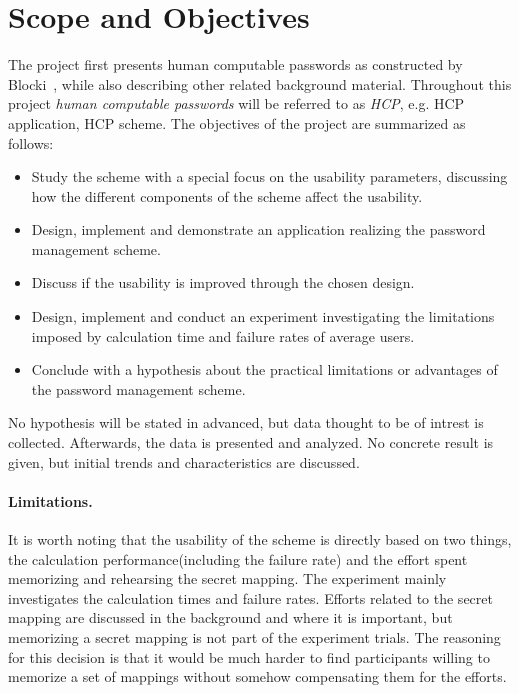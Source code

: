 
\section{Scope and Objectives}
The project first presents human computable passwords as constructed by Blocki~\cite{hcp-blocki}, while also describing other related background material. Throughout this project \emph{human computable passwords} will be referred to as \emph{HCP}, e.g. HCP application, HCP scheme. The objectives of the project are summarized as follows:
\begin{itemize}
    \item Study the scheme with a special focus on the usability parameters, discussing how the different components of the scheme affect the usability.
    \item Design, implement and demonstrate an application realizing the password management scheme.
    \item Discuss if the usability is improved through the chosen design. 
    \item Design, implement and conduct an experiment investigating the limitations imposed by calculation time and failure rates of average users.
    \item Conclude with a hypothesis about the practical limitations or advantages of the password management scheme.
\end{itemize}

\par No hypothesis will be stated in advanced, but data thought to be of intrest is collected. Afterwards, the data is presented and analyzed. No concrete result is given, but initial trends and characteristics are discussed.
\paragraph{Limitations.}
It is worth noting that the usability of the scheme is directly based on two things, the calculation performance(including the failure rate) and the effort spent memorizing and rehearsing the secret mapping. The experiment mainly investigates the calculation times and failure rates. Efforts related to the secret mapping are discussed in the background and where it is important, but memorizing a secret mapping is not part of the experiment trials. The reasoning for this decision is that it would be much harder to find participants willing to memorize a set of mappings without somehow compensating them for the efforts.



